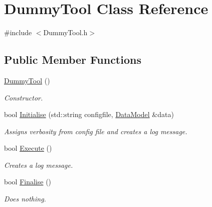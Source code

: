 \hypertarget{classDummyTool}{
\section{DummyTool Class Reference}
\label{classDummyTool}
}


{\ttfamily \#include $<$DummyTool.h$>$}\subsection*{Public Member Functions}
\begin{DoxyCompactItemize}
\item 
\hypertarget{classDummyTool_a33914471b4de346168aa92b5febb6f9c}{
\hyperlink{classDummyTool_a33914471b4de346168aa92b5febb6f9c}{DummyTool} ()}
\label{classDummyTool_a33914471b4de346168aa92b5febb6f9c}

\begin{DoxyCompactList}\small\item\em Constructor. \item\end{DoxyCompactList}\item 
\hypertarget{classDummyTool_a0d9cd781681a06ee3cf0cd1e7bb770a8}{
bool \hyperlink{classDummyTool_a0d9cd781681a06ee3cf0cd1e7bb770a8}{Initialise} (std::string configfile, \hyperlink{classDataModel}{DataModel} \&data)}
\label{classDummyTool_a0d9cd781681a06ee3cf0cd1e7bb770a8}

\begin{DoxyCompactList}\small\item\em Assigns verbosity from config file and creates a log message. \item\end{DoxyCompactList}\item 
\hypertarget{classDummyTool_ac107b31f1785c1cc803e0e65be548047}{
bool \hyperlink{classDummyTool_ac107b31f1785c1cc803e0e65be548047}{Execute} ()}
\label{classDummyTool_ac107b31f1785c1cc803e0e65be548047}

\begin{DoxyCompactList}\small\item\em Creates a log message. \item\end{DoxyCompactList}\item 
\hypertarget{classDummyTool_aacb5d0b9906a27c2b4bba4aae9bc093a}{
bool \hyperlink{classDummyTool_aacb5d0b9906a27c2b4bba4aae9bc093a}{Finalise} ()}
\label{classDummyTool_aacb5d0b9906a27c2b4bba4aae9bc093a}

\begin{DoxyCompactList}\small\item\em Does nothing. \item\end{DoxyCompactList}\end{DoxyCompactItemize}


